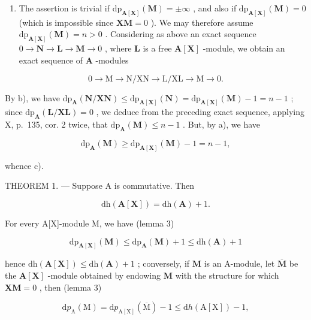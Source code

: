 \begin{enumerate}
\def\labelenumi{\alph{enumi})}
\setcounter{enumi}{2}
\tightlist
\item
  The assertion is trivial if \(\mathrm{dp}_{\mathbf{A}[\mathbf{X}]}(\mathbf{M}) = \pm \infty\) , and also if \(\mathrm{dp}_{\mathbf{A}[\mathbf{X}]}(\mathbf{M}) = 0\) (which is impossible since \(\mathbf{XM} = 0\) ). We may therefore assume \(\mathrm{dp}_{\mathbf{A}[\mathbf{X}]}(\mathbf{M}) = n > 0\) . Considering as above an exact sequence \(0 \to \mathbf{N} \to \mathbf{L} \to \mathbf{M} \to 0\) , where \(\mathbf{L}\) is a free \(\mathbf{A}[\mathbf{X}]\) -module, we obtain an exact sequence of \(\mathbf{A}\) -modules
\end{enumerate}

\[
0 \rightarrow \mathrm{M} \rightarrow \mathrm{N} / \mathrm{XN} \rightarrow \mathrm{L} / \mathrm{XL} \rightarrow \mathrm{M} \rightarrow 0.
\]

By b), we have \(\mathrm{dp}_{\mathbf{A}}(\mathbf{N} / \mathbf{X}\mathbf{N}) \leqslant \mathrm{dp}_{\mathbf{A}[\mathbf{X}]}(\mathbf{N}) = \mathrm{dp}_{\mathbf{A}[\mathbf{X}]}(\mathbf{M}) - 1 = n - 1\) ; since \(\mathrm{dp}_{\mathbf{A}}(\mathbf{L} / \mathbf{XL}) = 0\) , we deduce from the preceding exact sequence, applying X, p.~135, cor. 2 twice, that \(\mathrm{dp}_{\mathbf{A}}(\mathbf{M}) \leqslant n - 1\) . But, by a), we have

\[
\mathrm{dp} _ {\mathbf {A}} (\mathbf {M}) \geqslant \mathrm{dp} _ {\mathbf {A} [ \mathbf {X} ]} (\mathbf {M}) - 1 = n - 1,
\]

whence c).

THEOREM 1. --- Suppose A is commutative. Then

\[
\mathrm{dh} (\mathbf {A} [ \mathbf {X} ]) = \mathrm{dh} (\mathbf {A}) + 1.
\]

For every A{[}X{]}-module M, we have (lemma 3)

\[
\mathrm{dp} _ {\mathbf {A} [ \mathbf {X} ]} (\mathbf {M}) \leqslant \mathrm{dp} _ {\mathbf {A}} (\mathbf {M}) + 1 \leqslant \mathrm{dh} (\mathbf {A}) + 1
\]

hence \(\mathrm{dh}(\mathbf{A}[\mathbf{X}]) \leqslant \mathrm{dh}(\mathbf{A}) + 1\) ; conversely, if \(\mathbf{M}\) is an A-module, let \(\overline{\mathbf{M}}\) be the \(\mathbf{A}[\mathbf{X}]\) -module obtained by endowing \(\mathbf{M}\) with the structure for which \(\mathbf{X}\mathbf{M} = 0\) , then (lemma 3)

\[
\mathrm{d} p _ {\mathrm{A}} (\mathrm{M}) = \mathrm{d} p _ {\mathrm{A} [ \mathrm{X} ]} (\overline {{\mathrm{M}}}) - 1 \leqslant \mathrm{d} h (\mathrm{A} [ \mathrm{X} ]) - 1,
\]

